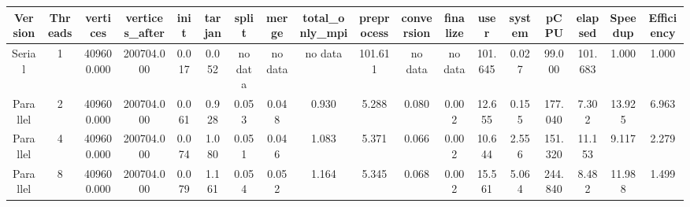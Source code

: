 \begin{tabular}{|c|c|c|c|c|c|c|c|c|c|c|c|c|c|c|c|c|c|}
\toprule
 Version &  Threads &   vertices &  vertices\_after &  init &  tarjan &   split &   merge & total\_only\_mpi &  preprocess & conversion & finalize &    user &  system &    pCPU &  elapsed &  Speedup &  Efficiency \\
\midrule
  Serial &        1 & 409600.000 &      200704.000 & 0.017 &   0.052 & no data & no data &        no data &     101.611 &    no data &  no data & 101.645 &   0.027 &  99.000 &  101.683 &    1.000 &       1.000 \\
Parallel &        2 & 409600.000 &      200704.000 & 0.061 &   0.928 &   0.053 &   0.048 &          0.930 &       5.288 &      0.080 &    0.002 &  12.655 &   0.155 & 177.040 &    7.302 &   13.925 &       6.963 \\
Parallel &        4 & 409600.000 &      200704.000 & 0.074 &   1.080 &   0.051 &   0.046 &          1.083 &       5.371 &      0.066 &    0.002 &  10.644 &   2.556 & 151.320 &   11.153 &    9.117 &       2.279 \\
Parallel &        8 & 409600.000 &      200704.000 & 0.079 &   1.161 &   0.054 &   0.052 &          1.164 &       5.345 &      0.068 &    0.002 &  15.561 &   5.064 & 244.840 &    8.482 &   11.988 &       1.499 \\
\bottomrule
\end{tabular}
